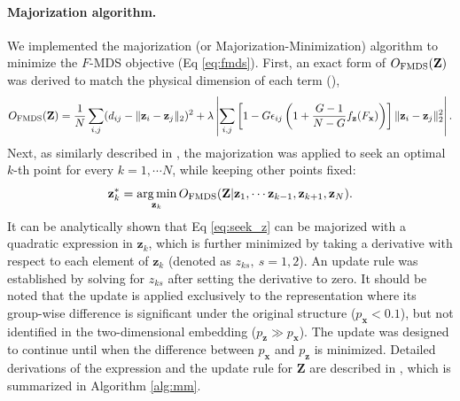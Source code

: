 \documentclass[10pt,letterpaper]{article}
\DeclareMathOperator*{\argmin}{arg\,min}
\newcommand{\1}{{\rm 1}\kern-0.24em{\rm I}}
\begin{document}
\paragraph*{Majorization algorithm.}
We implemented the majorization (or Majorization-Minimization) algorithm to minimize the $F$-MDS objective (Eq \ref{eq:fmds}). First, an exact form of $O_{\rm FMDS}(\mathbf{Z})$ was derived to match the physical dimension of each term (),
\begin{equation}
    O_{\rm FMDS}(\mathbf{Z}) = \frac{1}{N}\sum_{i,j} (d_{ij} - \| \mathbf{z}_i - \mathbf{z}_j \|_2 )^2 + \lambda\left|\sum_{i,j} \left[1- G\epsilon_{ij} \left(1+\frac{G-1}{N-G}f_\mathbf{z}(F_\mathbf{x})\right)\right] \|\mathbf{z}_i - \mathbf{z}_j\|_2^2\right|.
\end{equation}
Next, as similarly described in \cite{borg05c, witten11}, the majorization was applied to seek an optimal $k$-th point for every $k=1,\cdots N$, while keeping other points fixed:
\begin{equation}
    \mathbf{z}_k^* = \argmin_{\mathbf{z}_k}O_{\rm FMDS}(\mathbf{Z} | \mathbf{z}_1,\cdots \mathbf{z}_{k-1}, \mathbf{z}_{k+1}, \mathbf{z}_N).
    \label{eq:seek_z}
\end{equation}
It can be analytically shown that Eq \ref{eq:seek_z} can be majorized with a quadratic expression in $\mathbf{z}_k$, which is further minimized by taking a derivative with respect to each element of $\mathbf{z}_k$ (denoted as ${z}_{ks},\ s=1,2$). An update rule was established by solving for ${z}_{ks}$ after setting the derivative to zero. It should be noted that the update is applied exclusively to the representation where its group-wise difference is significant under the original structure ($p_\mathbf{x} < 0.1$), but not identified in the two-dimensional embedding ($p_\mathbf{z}\gg p_\mathbf{x}$). The update was designed to continue until when the difference between $p_\mathbf{x}$ and $p_\mathbf{z}$ is minimized. Detailed derivations of the expression and the update rule for $\mathbf{Z}$ are described in , which is summarized in Algorithm \ref{alg:mm}.
\end{document}
